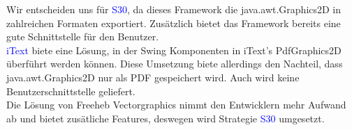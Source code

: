 \documentclass[enabledeprecatedfontcommands,fontsize=11pt,paper=a4,twoside]{scrartcl}
\newcounter{one}
\newcommand{\cb}[1]{{\textcolor{blue}{#1}}}
\begin{document}
\begin{onehalfspace}
	Wir entscheiden uns für \cb{S30}, da dieses Framework die java.awt.Graphics2D in zahlreichen Formaten exportiert. Zusätzlich bietet das Framework bereits eine gute Schnittstelle für den Benutzer. \\
	\cb{iText} biete eine Lösung, in der Swing Komponenten in iText’s PdfGraphics2D überführt werden können. Diese Umsetzung biete allerdings den Nachteil, dass java.awt.Graphics2D nur als PDF gespeichert wird. Auch wird keine Benutzerschnittstelle geliefert. \\
	Die Lösung von Freeheb Vectorgraphics nimmt den Entwicklern mehr Aufwand ab und bietet zusätliche Features, deswegen wird Strategie \cb{S30} umgesetzt.
\end{onehalfspace}
\newpage
\end{document}
